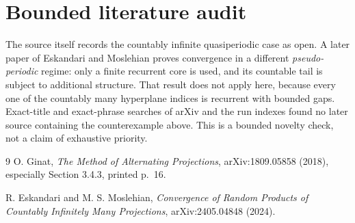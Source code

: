 \documentclass[11pt]{article}
\begin{document}
\section{Bounded literature audit}

The source itself records the countably infinite quasiperiodic case as open.
A later paper of Eskandari and Moslehian \cite{later} proves convergence in a
different \emph{pseudo-periodic} regime: only a finite recurrent core is used,
and its countable tail is subject to additional structure.  That result does
not apply here, because every one of the countably many hyperplane indices is
recurrent with bounded gaps.  Exact-title and exact-phrase searches of arXiv
and the run indexes found no later source containing the counterexample above.
This is a bounded novelty check, not a claim of exhaustive priority.

\begin{thebibliography}{9}
O. Ginat,
\emph{The Method of Alternating Projections},
arXiv:1809.05858 (2018), especially Section 3.4.3, printed p.~16.

R. Eskandari and M. S. Moslehian,
\emph{Convergence of Random Products of Countably Infinitely Many
Projections}, arXiv:2405.04848 (2024).
\end{thebibliography}
\end{document}
